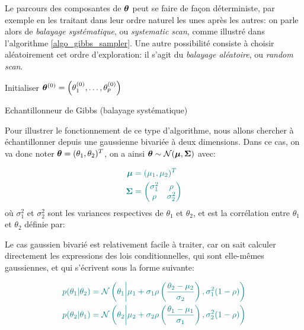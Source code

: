 Le parcours des composantes de ${\bm{\theta}}$ peut se faire de façon déterministe, par exemple en les traitant dans leur ordre naturel les unes après les autres: on parle alors de \textit{balayage systématique}, ou \textit{systematic scan}, comme illustré dans l'algorithme \ref{algo_gibbs_sampler}. Une autre possibilité consiste à choisir aléatoirement cet ordre d'exploration: il s'agit du \textit{balayage aléatoire}, ou \textit{random scan}. \\

\IncMargin{1em}
\begin{algorithm}
	\SetAlgoLined
	Initialiser ${\bm{\theta}}^{(0)} = \left(\theta_1^{(0)}, \dots, \theta_p^{(0)}\right)$\;
	\caption{Echantillonneur de Gibbs (balayage systématique)}
	\label{algo_gibbs_sampler}
\end{algorithm}

Pour illustrer le fonctionnement de ce type d'algorithme, nous allons chercher à échantillonner depuis une gaussienne bivariée à deux dimensions. Dans ce cas, on va donc noter ${\bm{\theta}} = (\theta_1, \theta_2)^T$, on a ainsi ${\bm{\theta}} \sim \mathcal{N}({\bm{\mu}}, {\bm{\Sigma}})$ avec: 

\begin{equation}
\NdFS{
\label{eq_caracs_gaussienne_bivariee}
\begin{split}
\VecMu &= (\mu_1, \mu_2)^T \\
\MatSigma &= \begin{pmatrix}
\sigma_{1}^2 & \corr\\
 \corr & \sigma_{2}^2 
\end{pmatrix}
\end{split}
}
\end{equation} 
où $\sigma_1^2$ et $\sigma_2^2$ sont les variances respectives de $\theta_1$ et $\theta_2$, et \NdFS{$\corr$} est la corrélation entre $\theta_1$ et $\theta_2$ définie par: 

Le cas gaussien bivarié est relativement facile à traiter, car on sait calculer directement les expressions des lois conditionnelles, qui sont elle-mêmes gaussiennes, et qui s'écrivent sous la forme suivante:

 \begin{equation}
 \NdFS{
 \label{eq_conditionnelles_gaussienne_bivariee}
 \begin{split}
 p(\theta_1 | \theta_2) &= \mathcal{N}\left(\theta_1 \middle\vert \mu_1 + \sigma_1 \corr\left(\dfrac{\theta_2 - \mu_2}{\sigma_2}\right), \sigma_1^2 (1-\corr)\right) \\
 p(\theta_2 | \theta_1) &= \mathcal{N}\left(\theta_2 \middle\vert \mu_2 + \sigma_2 \corr\left(\dfrac{\theta_1 - \mu_1}{\sigma_1}\right), \sigma_2^2 (1-\corr)\right)
 \end{split}
}
 \end{equation}
 
